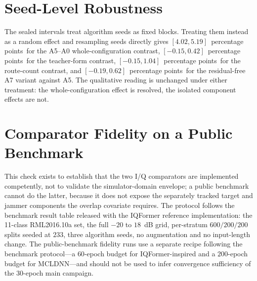 \documentclass[letterpaper,onecolumn,11pt,journal]{IEEEtran}
\newcommand{\pp}{percentage points}
\begin{document}
\section{Seed-Level Robustness}
The sealed intervals treat algorithm seeds as fixed blocks. Treating them
instead as a random effect and resampling seeds directly gives
$[4.02,5.19]$~\pp\ for the A5--A0 whole-configuration contrast,
$[-0.15,0.42]$~\pp\ for the teacher-form contrast, $[-0.15,1.04]$~\pp\ for the
route-count contrast, and $[-0.19,0.62]$~\pp\ for the residual-free A7 variant
against A5. The qualitative reading is unchanged under either treatment: the
whole-configuration effect is resolved, the isolated component effects are not.

\section{Comparator Fidelity on a Public Benchmark}
This check exists to establish that the two I/Q comparators are implemented
competently, not to validate the simulator-domain envelope; a public benchmark
cannot do the latter, because it does not expose the separately tracked target
and jammer components the overlap covariate requires. The protocol follows the
benchmark result table released with the IQFormer reference implementation:
the 11-class RML2016.10a set, the full $-20$ to $18$~dB grid, per-stratum
$600/200/200$ splits seeded at $233$, three algorithm seeds, no augmentation
and no input-length change. The public-benchmark fidelity runs use a separate
recipe following the benchmark protocol---a $60$-epoch budget for
IQFormer-inspired and a $200$-epoch budget for MCLDNN---and should not be used
to infer convergence sufficiency of the $30$-epoch main campaign.
\end{document}
